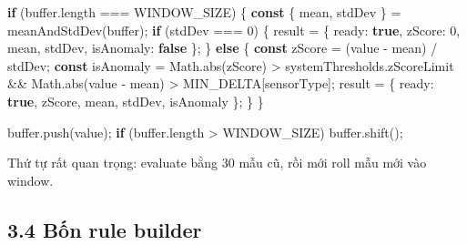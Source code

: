 \documentclass[11pt,oneside,openany]{book}
\newenvironment{Shaded}{\begin{snugshade}}{\end{snugshade}}
\newcommand{\AttributeTok}[1]{\textcolor[rgb]{0.16,0.50,0.73}{#1}}
\newcommand{\BuiltInTok}[1]{\textcolor[rgb]{0.50,0.55,0.55}{#1}}
\newcommand{\ControlFlowTok}[1]{\textcolor[rgb]{0.99,0.74,0.29}{\textbf{#1}}}
\newcommand{\DataTypeTok}[1]{\textcolor[rgb]{0.16,0.50,0.73}{#1}}
\newcommand{\DecValTok}[1]{\textcolor[rgb]{0.96,0.45,0.00}{#1}}
\newcommand{\FunctionTok}[1]{\textcolor[rgb]{0.56,0.27,0.68}{#1}}
\newcommand{\KeywordTok}[1]{\textcolor[rgb]{0.81,0.81,0.76}{\textbf{#1}}}
\newcommand{\NormalTok}[1]{\textcolor[rgb]{0.81,0.81,0.76}{#1}}
\newcommand{\OperatorTok}[1]{\textcolor[rgb]{0.81,0.81,0.76}{#1}}
\renewenvironment{Shaded}{%
  \def\FrameCommand{\fboxsep=8pt\colorbox{shadecolor}}%
  \MakeFramed{\advance\hsize-\width\FrameRestore}%
}{\endMakeFramed}
\begin{document}
\begin{Shaded}
\begin{Highlighting}[]
\ControlFlowTok{if}\NormalTok{ (buffer}\OperatorTok{.}\AttributeTok{length} \OperatorTok{===}\NormalTok{ WINDOW\_SIZE) \{}
  \KeywordTok{const}\NormalTok{ \{ mean}\OperatorTok{,}\NormalTok{ stdDev \} }\OperatorTok{=} \FunctionTok{meanAndStdDev}\NormalTok{(buffer)}\OperatorTok{;}
  \ControlFlowTok{if}\NormalTok{ (stdDev }\OperatorTok{===} \DecValTok{0}\NormalTok{) \{}
\NormalTok{    result }\OperatorTok{=}\NormalTok{ \{ }\DataTypeTok{ready}\OperatorTok{:} \KeywordTok{true}\OperatorTok{,} \DataTypeTok{zScore}\OperatorTok{:} \DecValTok{0}\OperatorTok{,}\NormalTok{ mean}\OperatorTok{,}\NormalTok{ stdDev}\OperatorTok{,} \DataTypeTok{isAnomaly}\OperatorTok{:} \KeywordTok{false}\NormalTok{ \}}\OperatorTok{;}
\NormalTok{  \} }\ControlFlowTok{else}\NormalTok{ \{}
    \KeywordTok{const}\NormalTok{ zScore }\OperatorTok{=}\NormalTok{ (value }\OperatorTok{{-}}\NormalTok{ mean) }\OperatorTok{/}\NormalTok{ stdDev}\OperatorTok{;}
    \KeywordTok{const}\NormalTok{ isAnomaly }\OperatorTok{=} \BuiltInTok{Math}\OperatorTok{.}\FunctionTok{abs}\NormalTok{(zScore) }\OperatorTok{\textgreater{}}\NormalTok{ systemThresholds}\OperatorTok{.}\AttributeTok{zScoreLimit}
      \OperatorTok{\&\&} \BuiltInTok{Math}\OperatorTok{.}\FunctionTok{abs}\NormalTok{(value }\OperatorTok{{-}}\NormalTok{ mean) }\OperatorTok{\textgreater{}}\NormalTok{ MIN\_DELTA[sensorType]}\OperatorTok{;}
\NormalTok{    result }\OperatorTok{=}\NormalTok{ \{ }\DataTypeTok{ready}\OperatorTok{:} \KeywordTok{true}\OperatorTok{,}\NormalTok{ zScore}\OperatorTok{,}\NormalTok{ mean}\OperatorTok{,}\NormalTok{ stdDev}\OperatorTok{,}\NormalTok{ isAnomaly \}}\OperatorTok{;}
\NormalTok{  \}}
\NormalTok{\}}

\NormalTok{buffer}\OperatorTok{.}\FunctionTok{push}\NormalTok{(value)}\OperatorTok{;}
\ControlFlowTok{if}\NormalTok{ (buffer}\OperatorTok{.}\AttributeTok{length} \OperatorTok{\textgreater{}}\NormalTok{ WINDOW\_SIZE) buffer}\OperatorTok{.}\FunctionTok{shift}\NormalTok{()}\OperatorTok{;}
\end{Highlighting}
\end{Shaded}

Thứ tự rất quan trọng: evaluate bằng 30 mẫu cũ, rồi mới roll mẫu mới vào
window.

\subsection{3.4 Bốn rule builder}\label{34-bux1ed1n-rule-builder}
\end{document}
